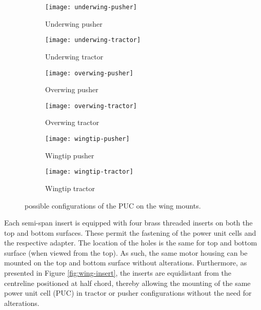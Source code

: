 \documentclass[../../main.tex]{subfiles}
\begin{document}
\begin{figure}[H]
    
    \centering
    \begin{subfigure}[b]{0.49\columnwidth}
        \centering
        \texttt{[image: underwing-pusher]}
        \caption{Underwing pusher}
        \label{fig:wing-mounting:underwing-pusher}
    \end{subfigure}
    \hfill
    \begin{subfigure}[b]{0.49\columnwidth}
        \centering
        \texttt{[image: underwing-tractor]}
        \caption{Underwing tractor}
        \label{fig:wing-mounting:underwing-tractor}
    \end{subfigure}
    
    \centering
    \begin{subfigure}[b]{0.49\columnwidth}
        \centering
        \texttt{[image: overwing-pusher]}
        \caption{Overwing pusher}
        \label{fig:wing-mounting:overwing-pusher}
    \end{subfigure}
    \hfill
    \begin{subfigure}[b]{0.49\columnwidth}
        \centering
        \texttt{[image: overwing-tractor]}
        \caption{Overwing tractor}
        \label{fig:wing-mounting:overwing-tractor}
    \end{subfigure}
    
    \centering
    \begin{subfigure}[b]{0.49\columnwidth}
        \centering
        \texttt{[image: wingtip-pusher]}
        \caption{Wingtip pusher}
        \label{fig:wing-mounting:wingtip-pusher}
    \end{subfigure}
    \hfill
    \begin{subfigure}[b]{0.49\columnwidth}
        \centering
        \texttt{[image: wingtip-tractor]}
        \caption{Wingtip tractor}
        \label{fig:wing-mounting:wingtip-tractor}
    \end{subfigure}
    
    \caption{possible configurations of the PUC on the wing mounts.}
    \label{fig:wing-mounting}
\end{figure}

Each semi-span insert is equipped with four brass threaded inserts on both the top and bottom surfaces.
These permit the fastening of the power unit cells and the respective adapter.
The location of the holes is the same for top and bottom surface (when viewed from the top).
As such, the same motor housing can be mounted on the top and bottom surface without alterations.
Furthermore, as presented in Figure \ref{fig:wing-insert}, the inserts are equidistant from the centreline positioned at half chord, thereby allowing the mounting of the same power unit cell (PUC) in tractor or pusher configurations without the need for alterations. 
\end{document}

